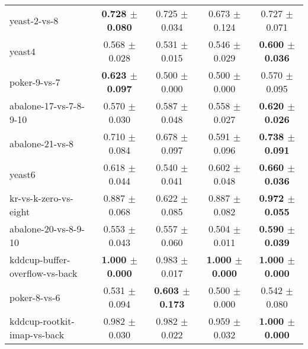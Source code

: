 \begin{table}[!ht]
{\begin{tabular}{l c c c c}
yeast-2-vs-8 & \textbf{0.728 $\pm$ 0.080} & 0.725 $\pm$ 0.034 & 0.673 $\pm$ 0.124 & 0.727 $\pm$ 0.071 \\
yeast4 & 0.568 $\pm$ 0.028 & 0.531 $\pm$ 0.015 & 0.546 $\pm$ 0.029 & \textbf{0.600 $\pm$ 0.036} \\
poker-9-vs-7 & \textbf{0.623 $\pm$ 0.097} & 0.500 $\pm$ 0.000 & 0.500 $\pm$ 0.000 & 0.570 $\pm$ 0.095 \\
abalone-17-vs-7-8-9-10 & 0.570 $\pm$ 0.030 & 0.587 $\pm$ 0.048 & 0.558 $\pm$ 0.027 & \textbf{0.620 $\pm$ 0.026} \\
abalone-21-vs-8 & 0.710 $\pm$ 0.084 & 0.678 $\pm$ 0.097 & 0.591 $\pm$ 0.096 & \textbf{0.738 $\pm$ 0.091} \\
yeast6 & 0.618 $\pm$ 0.044 & 0.540 $\pm$ 0.041 & 0.602 $\pm$ 0.048 & \textbf{0.660 $\pm$ 0.036} \\
kr-vs-k-zero-vs-eight & 0.887 $\pm$ 0.068 & 0.622 $\pm$ 0.085 & 0.887 $\pm$ 0.082 & \textbf{0.972 $\pm$ 0.055} \\
abalone-20-vs-8-9-10 & 0.553 $\pm$ 0.043 & 0.557 $\pm$ 0.060 & 0.504 $\pm$ 0.011 & \textbf{0.590 $\pm$ 0.039} \\
kddcup-buffer-overflow-vs-back & \textbf{1.000 $\pm$ 0.000} & 0.983 $\pm$ 0.017 & \textbf{1.000 $\pm$ 0.000} & \textbf{1.000 $\pm$ 0.000} \\
poker-8-vs-6 & 0.531 $\pm$ 0.094 & \textbf{0.603 $\pm$ 0.173} & 0.500 $\pm$ 0.000 & 0.542 $\pm$ 0.080 \\
kddcup-rootkit-imap-vs-back & 0.982 $\pm$ 0.030 & 0.982 $\pm$ 0.022 & 0.959 $\pm$ 0.032 & \textbf{1.000 $\pm$ 0.000} \\
\end{tabular}}
\end{table}
